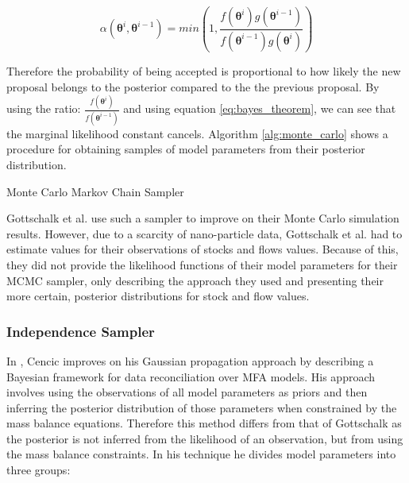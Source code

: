 \documentclass[ %
                    author={Tom Jager},
                supervisor={Dr. Daniel Schien},
                    degree={MEng},
                     title={A Bayesian Inference Engine for UMIS Structured Data},
                  subtitle={},
                      type={research},
                      year={2019} ]{dissertation}
\begin{document}
\begin{equation}
    \alpha(\bm{\theta}^i, \bm{\theta}^{i-1}) = min (1, \frac{f(\bm{\theta}^i)g(\bm{\theta}^{i-1})}{f(\bm{\theta}^{i-1})g(\bm{\theta}^{i})})
\end{equation}

Therefore the probability of being accepted is proportional to how likely the new proposal belongs to the posterior compared to the the previous proposal. By using the ratio: $\frac{f(\bm{\theta}^i)}{f(\bm{\theta}^{i-1})}$ and using equation \ref{eq:bayes_theorem}, we can see that the marginal likelihood constant cancels. Algorithm \ref{alg:monte_carlo} shows a procedure for obtaining samples of model parameters from their posterior distribution.

\begin{algorithm}[]
    \caption{Monte Carlo Markov Chain Sampler}
    \label{alg:monte_carlo}
\end{algorithm}

Gottschalk et al. use such a sampler to improve on their Monte Carlo simulation results. However, due to a scarcity of nano-particle data, Gottschalk et al. had to estimate values for their observations of stocks and flows values. Because of this, they did not provide the likelihood functions of their model parameters for their MCMC sampler, only describing the approach they used and presenting their more certain, posterior distributions for stock and flow values.

\subsubsection{Independence Sampler}

In \cite{cencic2018data, cencic2015general}, Cencic improves on his Gaussian propagation approach by describing a Bayesian framework for data reconciliation over MFA models. His approach involves using the observations of all model parameters as priors and then inferring the posterior distribution of those parameters when constrained by the mass balance equations. Therefore this method differs from that of Gottschalk as the posterior is not inferred from the likelihood of an observation, but from using the mass balance constraints. In his technique he divides model parameters into three groups:
\end{document}
